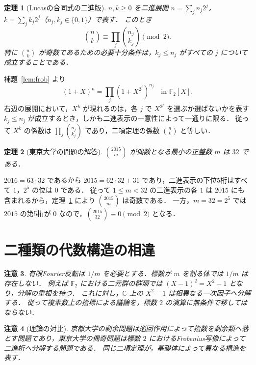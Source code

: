 \documentclass[a5paper,10pt,onecolumn]{jsarticle}
\makeatletter
\theoremstyle{mathnotetheorem}
\newtheorem{theorem}{定理}[section]
\newtheorem{remark}[theorem]{注意}
\renewcommand{\proofname}{証明}
\renewenvironment{proof}[1][\proofname]{%
  \par\pushQED{\qed}\normalfont\topsep4\p@\@plus2\p@\relax
  \trivlist\item[\hskip\labelsep\bfseries #1]\ignorespaces
}{\popQED\endtrivlist\@endpefalse}
\makeatother
\begin{document}
\begin{theorem}[Lucasの合同式の二進版]\label{thm:lucas}
$n,k\ge0$ を二進展開 $n=\sum_jn_j2^j$，$k=\sum_jk_j2^j$（$n_j,k_j\in\{0,1\}$）で表す．
このとき
\[
 \binom nk\equiv\prod_j\binom{n_j}{k_j}\pmod2.
\]
特に $\binom nk$ が奇数であるための必要十分条件は，$k_j\le n_j$ がすべての $j$ について成立することである．
\end{theorem}
\begin{proof}
補題~\ref{lem:frob} より
\[
 (1+X)^n=\prod_j(1+X^{2^j})^{n_j}
\quad\text{in }\mathbb F_2[X].
\]
右辺の展開において，$X^k$ が現れるのは，各 $j$ で $X^{2^j}$ を選ぶか選ばないかを表す $k_j\le n_j$ が成立するとき，しかも二進表示の一意性によって一通りに限る．
従って $X^k$ の係数は $\prod_j\binom{n_j}{k_j}$ であり，二項定理の係数 $\binom nk$ と等しい．
\end{proof}

\begin{theorem}[東京大学の問題の解答]
$\binom{2015}{m}$ が偶数となる最小の正整数 $m$ は $32$ である．
\end{theorem}
\begin{proof}
$2016=63\cdot32$ であるから $2015=62\cdot32+31$ であり，二進表示の下位5桁はすべて $1$，$2^5$ の位は $0$ である．
従って $1\le m<32$ の二進表示の各 $1$ は $2015$ にも含まれるから，定理~\ref{thm:lucas} により $\binom{2015}{m}$ は奇数である．
一方，$m=32=2^5$ では $2015$ の第5桁が $0$ なので，$\binom{2015}{32}\equiv0\pmod2$ となる．
\end{proof}

\section{二種類の代数構造の相違}
\begin{remark}
有限Fourier反転は $1/m$ を必要とする．標数が $m$ を割る体では $1/m$ は存在しない．
例えば $\mathbb F_2$ における二元群の群環では
$(X-1)^2=X^2-1$ となり，分解の重根を持つ．
これに対し，$\mathbb C$ 上の $X^2-1$ は相異なる一次因子へ分解する．
従って複素数上の指標による議論を，標数 $2$ の演算に無条件で移してはならない．
\end{remark}
\begin{remark}[理論の対比]
京都大学の剰余問題は巡回作用によって指数を剰余類へ落とす問題であり，東京大学の偶奇問題は標数 $2$ におけるFrobenius写像によって二進桁へ分解する問題である．
同じ二項定理が，基礎体によって異なる構造を表す．
\end{remark}
\end{document}

